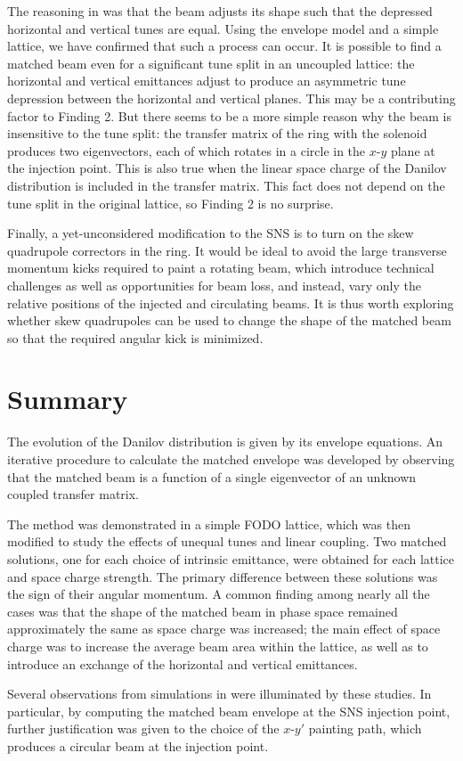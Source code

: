 The reasoning in \cite{Holmes2018} was that the beam adjusts its shape such that the depressed horizontal and vertical tunes are equal. Using the envelope model and a simple lattice, we have confirmed that such a process can occur. It is possible to find a matched beam even for a significant tune split in an uncoupled lattice: the horizontal and vertical emittances adjust to produce an asymmetric tune depression between the horizontal and vertical planes. This may be a contributing factor to Finding 2. But there seems to be a more simple reason why the beam is insensitive to the tune split: the transfer matrix of the ring with the solenoid produces two eigenvectors, each of which rotates in a circle in the $x$-$y$ plane at the injection point. This is also true when the linear space charge of the Danilov distribution is included in the transfer matrix. This fact does not depend on the tune split in the original lattice, so Finding 2 is no surprise.

Finally, a yet-unconsidered modification to the SNS is to turn on the skew quadrupole correctors in the ring. It would be ideal to avoid the large transverse momentum kicks required to paint a rotating beam, which introduce technical challenges as well as opportunities for beam loss, and instead, vary only the relative positions of the injected and circulating beams. It is thus worth exploring whether skew quadrupoles can be used to change the shape of the matched beam so that the required angular kick is minimized.



\section{Summary}

The evolution of the Danilov distribution is given by its envelope equations. An iterative procedure to calculate the matched envelope was developed by observing that the matched beam is a function of a single eigenvector of an unknown coupled transfer matrix. 

The method was demonstrated in a simple FODO lattice, which was then modified to study the effects of unequal tunes and linear coupling. Two matched solutions, one for each choice of intrinsic emittance, were obtained for each lattice and space charge strength. The primary difference between these solutions was the sign of their angular momentum. A common finding among nearly all the cases was that the shape of the matched beam in phase space remained approximately the same as space charge was increased; the main effect of space charge was to increase the average beam area within the lattice, as well as to introduce an exchange of the horizontal and vertical emittances.

Several observations from simulations in \cite{Holmes2018} were illuminated by these studies. In particular, by computing the matched beam envelope at the SNS injection point, further justification was given to the choice of the $x$-$y'$ painting path, which produces a circular beam at the injection point.